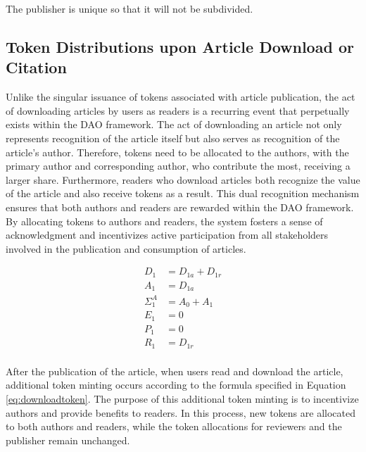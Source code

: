 \documentclass[lettersize,journal]{IEEEtran}
\begin{document}
The publisher is unique so that it will not be subdivided.

\subsection{Token Distributions upon Article Download or Citation}

Unlike the singular issuance of tokens associated with article publication, the act of downloading articles by users as readers is a recurring event that perpetually exists within the DAO framework. The act of downloading an article not only represents recognition of the article itself but also serves as recognition of the article's author. Therefore, tokens need to be allocated to the authors, with the primary author and corresponding author, who contribute the most, receiving a larger share.
Furthermore, readers who download articles both recognize the value of the article and also receive tokens as a result. This dual recognition mechanism ensures that both authors and readers are rewarded within the DAO framework. By allocating tokens to authors and readers, the system fosters a sense of acknowledgment and incentivizes active participation from all stakeholders involved in the publication and consumption of articles.

\begin{equation}
  \begin{aligned}
    D_1 &= D_{1a} + D_{1r} \\
    A_1 &= D_{1a} \\
    \Sigma^A_1 &= A_0 + A_1 \\
    E_1 &= 0 \\
    P_1 &= 0 \\
    R_1 &= D_{1r} \\
  \end{aligned}
  \label{eq:downloadtoken}
\end{equation}

After the publication of the article, when users read and download the article, additional token minting occurs according to the formula specified in Equation \ref{eq:downloadtoken}. The purpose of this additional token minting is to incentivize authors and provide benefits to readers. In this process, new tokens are allocated to both authors and readers, while the token allocations for reviewers and the publisher remain unchanged.
\end{document}
